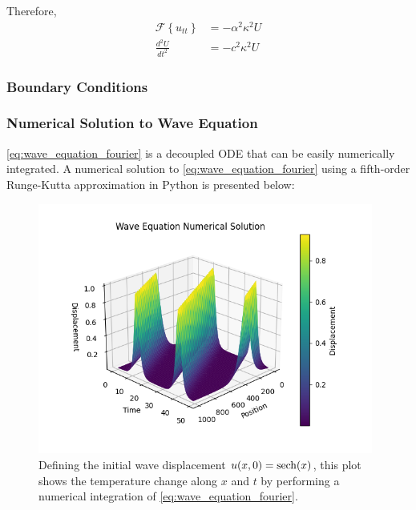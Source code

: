 \noindent
Therefore,
\begin{align}
    \mathcal{F} \left\{ u_{tt} \right\} &= -\alpha^2 \kappa^2 U \\
    \frac{d^2 U}{dt^2} &= -c^2 \kappa^2 U \label{eq:wave_equation_fourier}
\end{align}

\subsubsection{Boundary Conditions} %

\subsubsection{Numerical Solution to Wave Equation}
\cref{eq:wave_equation_fourier} is a decoupled ODE that can be easily numerically integrated. A numerical solution to \cref{eq:wave_equation_fourier} using a fifth-order Runge-Kutta approximation in Python is presented below:

\begin{figure}[H]
    \centering
    \includegraphics[width=110mm,height=\textheight,keepaspectratio]{images/wave_equation_numerical.png}
    \caption{Defining the initial wave displacement \(u(x, 0)=\operatorname{sech}(x)\), this plot shows the temperature change along \(x\) and \(t\) by performing a numerical integration of \cref{eq:wave_equation_fourier}.}
    \label{fig:wave_equation_numerical}
\end{figure}

